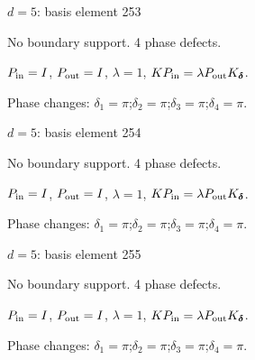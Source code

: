 \vfill
{\footnotesize\texttt{}}
\newpage
{}
{\Large $d=5$: basis element 253}\par
No boundary support. 4 phase defects.
\begin{center}
\end{center}
\vspace{-1mm}
$P_{\rm in}=I$, \quad $P_{\rm out}=I$, \quad $\lambda=1$, \qquad $K P_{\rm in}=\lambda P_{\rm out}K_{\boldsymbol\delta}$.
\par\smallskip\begin{minipage}{.98\linewidth}\small Phase changes: $\delta_{1}=\pi$;\quad $\delta_{2}=\pi$;\quad $\delta_{3}=\pi$;\quad $\delta_{4}=\pi$.\end{minipage}
\vfill
{\footnotesize\texttt{}}
\newpage
{}
{\Large $d=5$: basis element 254}\par
No boundary support. 4 phase defects.
\begin{center}
\end{center}
\vspace{-1mm}
$P_{\rm in}=I$, \quad $P_{\rm out}=I$, \quad $\lambda=1$, \qquad $K P_{\rm in}=\lambda P_{\rm out}K_{\boldsymbol\delta}$.
\par\smallskip\begin{minipage}{.98\linewidth}\small Phase changes: $\delta_{1}=\pi$;\quad $\delta_{2}=\pi$;\quad $\delta_{3}=\pi$;\quad $\delta_{4}=\pi$.\end{minipage}
\vfill
{\footnotesize\texttt{}}
\newpage
{}
{\Large $d=5$: basis element 255}\par
No boundary support. 4 phase defects.
\begin{center}
\end{center}
\vspace{-1mm}
$P_{\rm in}=I$, \quad $P_{\rm out}=I$, \quad $\lambda=1$, \qquad $K P_{\rm in}=\lambda P_{\rm out}K_{\boldsymbol\delta}$.
\par\smallskip\begin{minipage}{.98\linewidth}\small Phase changes: $\delta_{1}=\pi$;\quad $\delta_{2}=\pi$;\quad $\delta_{3}=\pi$;\quad $\delta_{4}=\pi$.\end{minipage}
\vfill
{\footnotesize\texttt{}}
